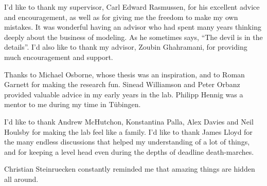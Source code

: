 
\begin{acknowledgements}      


I'd like to thank my supervisor, Carl Edward Rasmussen, for his excellent advice and encouragement, as well as for giving me the freedom to make my own mistakes.
It was wonderful having an advisor who had spent many years thinking deeply about the business of modeling. As he sometimes says, ``The devil is in the details''.
I'd also like to thank my advisor, Zoubin Ghahramani, for providing much encouragement and support.

Thanks to Michael Osborne, whose thesis was an inspiration, and to Roman Garnett for making the research fun.
Sinead Williamson and Peter Orbanz provided valuable advice in my early years in the lab.
Philipp Hennig was a mentor to me during my time in T\"{u}bingen.

I'd like to thank Andrew McHutchon, Konstantina Palla, Alex Davies and Neil Houlsby for making the lab feel like a family.
I'd like to thank James Lloyd for the many endless discussions that helped my understanding of a lot of things, and for keeping a level head even during the depths of deadline death-marches.

Christian Steinruecken constantly reminded me that amazing things are hidden all around.

\end{acknowledgements}
